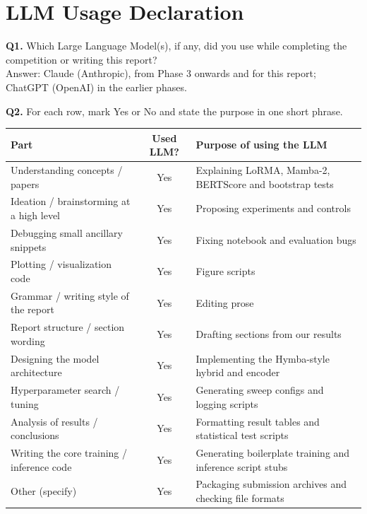 \documentclass[11pt, oneside]{article}
\begin{document}
\newpage
\section*{LLM Usage Declaration}
\noindent
\textbf{Q1.} Which Large Language Model(s), if any, did you use while completing the competition or writing this report? \\[0.4em]
Answer: Claude (Anthropic), from Phase 3 onwards and for this report; ChatGPT (OpenAI) in the earlier phases.
\medskip

\noindent
\textbf{Q2.} For each row, mark Yes or No and state the purpose in one short phrase.
\begin{table}[H]
\centering\small
\begin{tabular}{>{\raggedright\arraybackslash}p{4.6cm}|c|>{\raggedright\arraybackslash}p{7.2cm}}
\toprule
Part & Used LLM? & Purpose of using the LLM \\
\midrule
Understanding concepts / papers & Yes & Explaining LoRMA, Mamba-2, BERTScore and bootstrap tests \\
Ideation / brainstorming at a high level & Yes & Proposing experiments and controls \\
Debugging small ancillary snippets & Yes & Fixing notebook and evaluation bugs \\
Plotting / visualization code & Yes & Figure scripts \\
Grammar / writing style of the report & Yes & Editing prose \\
Report structure / section wording & Yes & Drafting sections from our results \\
Designing the model architecture & Yes & Implementing the Hymba-style hybrid and encoder \\
Hyperparameter search / tuning & Yes & Generating sweep configs and logging scripts \\
Analysis of results / conclusions & Yes & Formatting result tables and statistical test scripts \\
Writing the core training / inference code & Yes & Generating boilerplate training and inference script stubs \\
Other (specify) & Yes & Packaging submission archives and checking file formats \\
\bottomrule
\end{tabular}
\end{table}
\medskip
\end{document}
